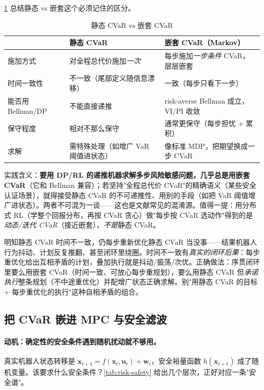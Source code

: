 \cref{tab:risk-static-nested} 总结静态 vs 嵌套这个必须记住的区分。

\begin{table}[H]\centering\small
\caption{静态 CVaR vs 嵌套 CVaR}
\label{tab:risk-static-nested}
\begin{tabular}{lll}
\toprule
 & 静态 CVaR & 嵌套 CVaR（Markov）\\
\midrule
施加方式 & 对全程总代价施加\emph{一次} & 每步施加\emph{一步条件} CVaR，层层嵌套 \\
时间一致性 & 不一致（尾部定义随信息漂移）& 一致（每步只看下一步）\\
能否用 Bellman/DP & 不能直接递推 & risk-averse Bellman 成立，VI/PI 收敛 \\
保守程度 & 相对不那么保守 & 通常更保守（每步担忧 + 累积）\\
求解 & 需特殊处理（如增广 VaR 阈值进状态）& 像标准 MDP，把期望换成一步 CVaR \\
\bottomrule
\end{tabular}
\end{table}

实践含义：\textbf{要用 DP/RL 的递推机器求解多步风险敏感问题，几乎总是用嵌套 CVaR}（它和 Bellman 兼容）；若坚持"全程总代价 CVaR"的精确语义（某些安全认证场景），就得接受静态 CVaR 的不可递推性、用别的手段（如把 VaR 阈值增广进状态）。两者不可混为一谈——这也是文献常见的混淆源。值得一提：用分布式 RL（学整个回报分布，再按 CVaR 贪心）做"每步按 CVaR 选动作"得到的是\emph{动态/迭代 CVaR}（接近嵌套），\emph{不是}静态 CVaR\cite{lim2022distributional}。

\begin{pitfall}
明知静态 CVaR 时间不一致，仍每步重新优化静态 CVaR 当没事——结果机器人行为抖动、计划反复推翻、甚至闭环里绕圈。时间不一致有\emph{真实的闭环后果}：每步重优化给出互相矛盾的计划，叠加执行就是抖动/振荡/次优。正确做法：序贯闭环里要么用嵌套 CVaR（时间一致、可放心每步重规划），要么用静态 CVaR 但\emph{承诺执行}整条规划（不中途重优化）并配增广状态正确求解。别"用静态 CVaR 的目标 + 每步重优化的执行"这种自相矛盾的组合。
\end{pitfall}

\subsection{把 CVaR 嵌进 MPC 与安全滤波}
\label{sec:risk-embed}

\paragraph{动机：确定性的安全条件遇到随机扰动就不够用。}
真实机器人状态转移是 $\mathbf{x}_{t+1}=f(\mathbf{x}_t,\mathbf{u}_t)+\mathbf{w}_t$，安全裕量函数 $h(\mathbf{x}_{t+1})$ 成了随机变量。该要求什么安全条件？\cref{tab:risk-safety} 给出几个层次，正好对应一条"安全谱"。

